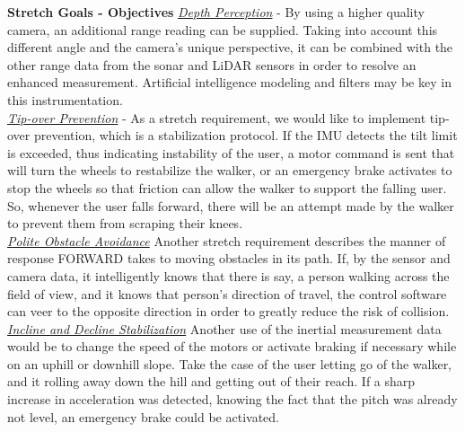 \noindent \textbf{Stretch Goals - Objectives} \newline
\noindent \underline{\textit{Depth Perception}} - By using a higher quality camera, an additional range reading can be supplied. Taking into account this different angle and the camera’s unique perspective, it can be combined with the other range data from the sonar and LiDAR sensors in order to resolve an enhanced measurement. Artificial intelligence modeling and filters may be key in this instrumentation. \\

\noindent \underline{\textit{Tip-over Prevention}} - As a stretch requirement, we would like to implement tip-over prevention, which is a stabilization protocol. If the IMU detects the tilt limit is exceeded, thus indicating instability of the user, a motor command is sent that will turn the wheels to restabilize the walker, or an emergency brake activates to stop the wheels so that friction can allow the walker to support the falling user. So, whenever the user falls forward, there will be an attempt made by the walker to prevent them from scraping their knees. \\

\noindent \underline{\textit{Polite Obstacle Avoidance}}
Another stretch requirement describes the manner of response FORWARD takes to moving obstacles in its path. If, by the sensor and camera data, it intelligently knows that there is say, a person walking across the field of view, and it knows that person's direction of travel, the control software can veer to the opposite direction in order to greatly reduce the risk of collision.\\

\noindent \underline{\textit{Incline and Decline Stabilization}}
Another use of the inertial measurement data would be to change the speed of the motors or activate braking if necessary while on an uphill or downhill slope. Take the case of the user letting go of the walker, and it rolling away down the hill and getting out of their reach. If a sharp increase in acceleration was detected, knowing the fact that the pitch was already not level, an emergency brake could be activated.\\
